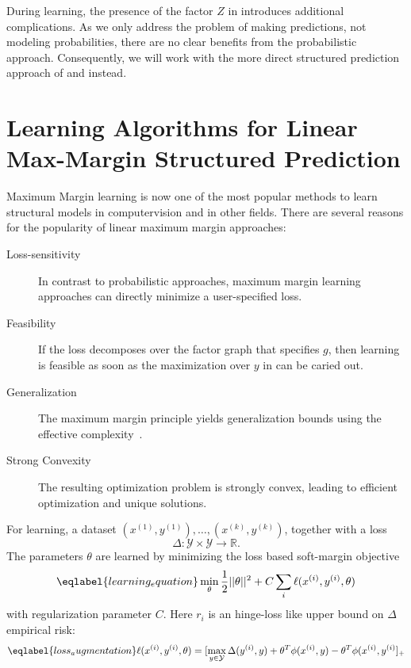 During learning, the presence of the factor $Z$ in 
introduces additional complications. As we only address the problem of making
predictions, not modeling probabilities, there are no clear benefits from the
probabilistic approach.  Consequently, we will work with the more direct
structured prediction approach of  and
 instead.



\section{Learning Algorithms for Linear Max-Margin Structured Prediction}
Maximum Margin learning is now one of the most popular methods to learn
structural models in computervision and in other fields.
There are several reasons for the popularity of linear maximum margin approaches:
\begin{description}
    \item[Loss-sensitivity] In contrast to probabilistic approaches, maximum margin learning approaches can directly
        minimize a user-specified loss.
    \item[Feasibility] If the loss decomposes over the factor graph that
        specifies $g$, then learning is feasible as soon as the maximization
        over $y$ in  can be caried out.
    \item[Generalization] The maximum margin principle yields generalization
        bounds using the effective complexity~\citep{taskar2003max}.
    \item[Strong Convexity] The resulting optimization problem is strongly
        convex, leading to efficient optimization and unique solutions.
\end{description}

For learning, a dataset $(x^{(1)}, y^{(1)}),\dotsc,(x^{(k)}, y^{(k)})$, together with a loss
\begin{equation}
    \Delta \colon \mathcal{Y} \times \mathcal{Y} \rightarrow \mathbb{R}.
\end{equation}
The parameters $\theta$ are learned by minimizing the loss based soft-margin
objective
\begin{equation}\eqlabel{learning_equation}
    \min_\theta \frac{1}{2} ||\theta||^2 + C \sum_i  \ell(x^{(i)}, y^{(i)}, \theta)
\end{equation}
with regularization parameter $C$. Here $r_i$ is an hinge-loss like upper bound
on $\Delta$ empirical risk:
\begin{equation}\eqlabel{loss_augmentation}
    \ell(x^{(i)}, y^{(i)}, \theta)= [\max_{y \in \mathcal{Y}} \Delta(y^{(i)}, y) + \theta^T \phi(x^{(i)}, y) - \theta^T \phi(x^{(i)}, y^{(i)}]_+
\end{equation}

